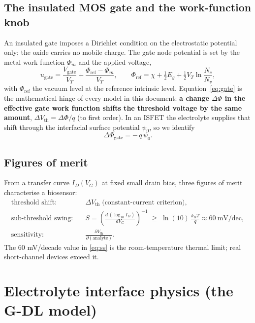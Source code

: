 \documentclass[11pt,a4paper]{article}
\begin{document}
\subsection{The insulated MOS gate and the work-function knob}
An insulated gate imposes a Dirichlet condition on the electrostatic potential
only; the oxide carries no mobile charge. The gate node potential is set by the
metal work function $\Phi_m$ and the applied voltage,
\begin{equation}
  u_{\mathrm{gate}} = \frac{V_{\mathrm{gate}}}{V_T}
  + \frac{\Phi_{\mathrm{ref}}-\Phi_m}{V_T},
  \qquad
  \Phi_{\mathrm{ref}} = \chi + \tfrac{1}{2}E_g
  + \tfrac{1}{2}V_T\ln\!\frac{N_c}{N_v},
  \label{eq:gate}
\end{equation}
with $\Phi_{\mathrm{ref}}$ the vacuum level at the reference intrinsic level.
Equation~\eqref{eq:gate} is the mathematical hinge of every model in this
document: \textbf{a change $\Delta\Phi$ in the effective gate work function shifts
the threshold voltage by the same amount}, $\Delta V_{\mathrm{th}}=\Delta\Phi/q$
(to first order). In an ISFET the electrolyte supplies that shift through the
interfacial surface potential $\psi_0$, so we identify
\begin{equation}
  \Delta\Phi_{\mathrm{gate}} = -\,q\,\psi_0 .
  \label{eq:map}
\end{equation}

\subsection{Figures of merit}
From a transfer curve $I_D(V_G)$ at fixed small drain bias, three figures of merit
characterise a biosensor:
\begin{align}
  \text{threshold shift:}\quad
    & \Delta V_{\mathrm{th}} \;\text{(constant-current criterion)}, \\
  \text{sub-threshold swing:}\quad
    & S = \left(\frac{d\,(\log_{10} I_D)}{dV_G}\right)^{-1}
      \;\ge\; \ln(10)\,\frac{k_BT}{q}\approx 60~\mathrm{mV/dec}, \label{eq:ss}\\
  \text{sensitivity:}\quad
    & \frac{\partial V_{\mathrm{th}}}{\partial(\text{analyte})}. \label{eq:sens}
\end{align}
The 60 mV/decade value in \eqref{eq:ss} is the room-temperature thermal limit;
real short-channel devices exceed it.

\section{Electrolyte interface physics (the G-DL model)}
\label{sec:gdl}
\end{document}
